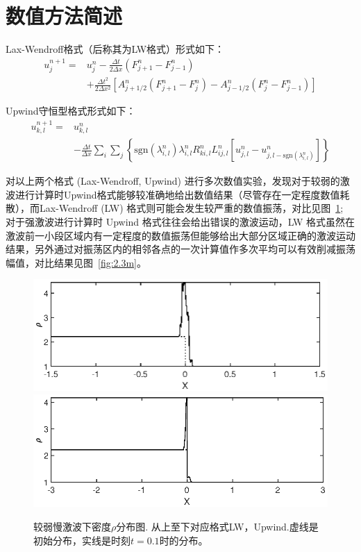 \documentclass{article}
\begin{document}
\section{数值方法简述}
Lax-Wendroff格式（后称其为LW格式）形式如下：
\begin{align}
u_j^{n+1} =& u_j^n-\frac{\Delta t}{2\Delta x}(F_{j+1}^n - F_{j-1}^n)\nonumber\\& + \frac{\Delta t^2}{2\Delta x^2}\left[A_{j+1/2}^n (F_{j+1}^n-F_j^n) - A_{j-1/2}^n (F_j^n -
F_{j-1}^n)\right]
\end{align}
\par
Upwind守恒型格式形式如下：
\begin{align}
u_{k,l}^{n+1} =& u_{k,l}^n \nonumber\\
& - \frac{\Delta t}{\Delta x} \sum_i \sum_j \left\{\text{sgn}(\lambda_{i,l}^n)
 \lambda_{i,l}^n R_{ki,l}^n L_{ij,l}^n \left[u_{j,l}^n - u_{j,l-\text{sgn}(\lambda_{i,l}^n)}^n\right]\right\}
\end{align}
\par
对以上两个格式 (Lax-Wendroff, Upwind) 进行多次数值实验，发现对于较弱的激波进行计算时Upwind格式能够较准确地给出数值结果（尽管存在一定程度数值耗散），而Lax-Wendroff (LW) 格式则可能会发生较严重的数值振荡，对比见图~\ref{fig:2.1m}; 对于强激波进行计算时 Upwind 格式往往会给出错误的激波运动，LW 格式虽然在激波前一小段区域内有一定程度的数值振荡但能够给出大部分区域正确的激波运动结果，另外通过对振荡区内的相邻各点的一次计算值作多次平均可以有效削减振荡幅值，对比结果见图~\ref{fig:2.3m}。
\begin{figure}[H]
    \centering
    \includegraphics[width=.75\textwidth]{2.1LW.eps}
    \includegraphics[width=.75\textwidth]{2.1Upwind.eps}
    \caption{较弱慢激波下密度$\rho$分布图. 从上至下对应格式LW，Upwind.虚线是初始分布，实线是时刻$t=0.1$时的分布。}
    \label{fig:2.1m}
\end{figure}
\end{document}
